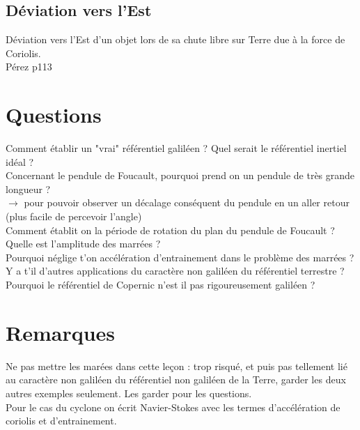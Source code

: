 \documentclass[12pt,prb,aps,epsf]{report}
\begin{document}
\subsection{Déviation vers l'Est}
Déviation vers l'Est d'un objet lors de sa chute libre sur Terre due à la force de Coriolis.\\
Pérez p113

\section*{Questions}
Comment établir un "vrai" référentiel galiléen ? Quel serait le référentiel inertiel idéal ?\\

Concernant le pendule de Foucault, pourquoi prend on un pendule de très grande longueur ?\\
$\rightarrow$ pour pouvoir observer un décalage conséquent du pendule en un aller retour (plus facile de percevoir l'angle)\\

Comment établit on la période de rotation du plan du pendule de Foucault ?\\

Quelle est l'amplitude des marrées ?\\

Pourquoi néglige t'on accélération d'entrainement dans le problème des marrées ?\\

Y a t'il d'autres applications du caractère non galiléen du référentiel terrestre ?\\

Pourquoi le référentiel de Copernic n'est il pas rigoureusement galiléen ?

\section*{Remarques}
Ne pas mettre les marées dans cette leçon : trop risqué, et puis pas tellement lié au caractère non galiléen du référentiel non galiléen de la Terre, garder les deux autres exemples seulement. Les garder pour les questions.\\
Pour le cas du cyclone on écrit Navier-Stokes avec les termes d'accélération de coriolis et d'entrainement.
\end{document}
